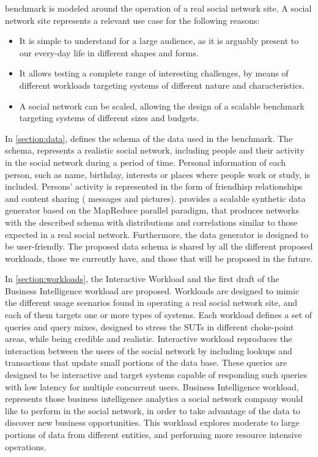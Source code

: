 \ldbcsnb benchmark is modeled around the operation of a real social network
site. A social network site represents a relevant use case for the following
reasons:

\begin{itemize}
    \item It is simple to understand for a large audience, as it is
        arguably present to our every-day life in different shapes and forms.
    \item It allows testing a complete range of interesting
        challenges, by means of different workloads targeting systems of
        different nature and characteristics.
    \item A social network can be scaled, allowing the design of a
        scalable benchmark targeting systems of different sizes and budgets.
\end{itemize}

In \autoref{section:data}, \ldbcsnb defines the schema of the data used in
the benchmark. The schema, represents a realistic social network, including
people and their activity in the social network during a period of time.
Personal information of each person, such as name, birthday, interests
or places where people work or study, is included. Persons' activity is
represented in the form of friendhisp relationships and content sharing (\ie
messages and pictures). \ldbcsnb provides a scalable synthetic data generator
based on the MapReduce parallel paradigm, that produces networks with the
described schema with distributions and correlations similar to those expected
in a real social network. Furthermore, the data generator is designed to be
user-friendly. The proposed data schema is shared by all the different proposed
workloads, those we currently have, and those that will be proposed in the future.

In \autoref{section:workloads}, the Interactive Workload and the first draft of
the Business Intelligence workload are proposed. Workloads are designed to mimic
the different usage scenarios found in operating a real social network site, and
each of them targets one or more types of systems.  Each workload defines a set
of queries and query mixes, designed to stress the SUTs in different choke-point
areas, while being credible and realistic. Interactive workload reproduces the
interaction between the users of the social network by including lookups and
transactions that update small portions of the data base.  These queries are
designed to be interactive and target systems capable of responding such queries
with low latency for multiple concurrent users. Business Intelligence workload,
represents those business intelligence analytics a social network company would
like to perform in the social network, in order to take advantage of the data to
discover new business opportunities. This workload explores moderate to large
portions of data from different entities, and performing more resource intensive
operations. 


